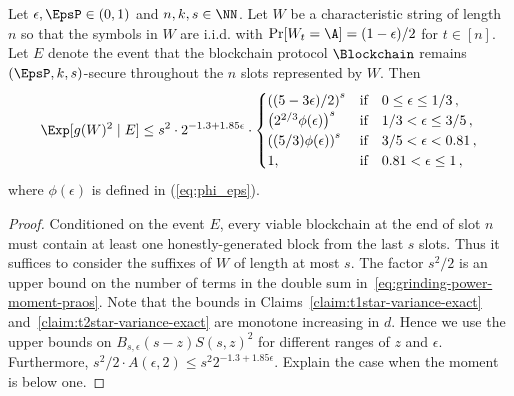 



\begin{lemma}\label{lemma:grinding-praos-second-moment}
  Let $\epsilon, \EpsP \in (0, 1)$ and $n, k, s \in \NN$. 
  Let $W$ be a characteristic string of length $n$ so that 
  the symbols in $W$ are i.i.d. 
  with $\Pr[W_t = \A] = (1 - \epsilon)/2$ for $t \in [n]$. 
  Let $E$ denote the event that 
  the blockchain protocol $\Blockchain$ 
  remains $(\EpsP, k, s)$-secure throughout 
  the $n$ slots represented by $W$. 
  Then
  \[
    \Exp[ g(W)^2 \mid E] 
    \leq s^2 \cdot 2^{- 1.3 + 1.85 \epsilon} \cdot \begin{cases}
      \left( (5-3 \epsilon)/2 \right)^s & \text{if}\quad 0 \leq \epsilon \leq 1/3\,, \\
      \left( 2^{2/3} \phi(\epsilon) \right)^s & \text{if}\quad 1/3 < \epsilon \leq 3/5\,, \\
      \left( (5/3) \phi(\epsilon) \right)^s & \text{if}\quad 3/5 < \epsilon < 0.81\,, \\
      1,  & \text{if}\quad 0.81 < \epsilon \leq 1\,,
    \end{cases}
  \]
  where $\phi(\epsilon)$ is defined in (\ref{eq:phi_eps}).
\end{lemma}
\begin{proof}
  Conditioned on the event $E$, 
  every viable blockchain at the end of slot $n$ 
  must contain at least one honestly-generated block from the last $s$ slots. 
  Thus it suffices to consider the suffixes of $W$ of length at most $s$. 
  The factor $s^2/2$ is an upper bound on 
  the number of terms in the double sum in~\eqref{eq:grinding-power-moment-praos}. 
  Note that the bounds in 
  Claims~\ref{claim:t1star-variance-exact} 
  and~\ref{claim:t2star-variance-exact} are monotone increasing in $d$. 
  Hence we use the upper bounds on $B_{s, \epsilon}(s-z) S(s,z)^2$ for 
  different ranges of $z$ and $\epsilon$. 
  Furthermore, $s^2/2 \cdot A(\epsilon,2) \leq s^2 2^{-1.3 + 1.85 \epsilon}$.
  {\color{blue}Explain the case when the moment is below one.}
\end{proof}

